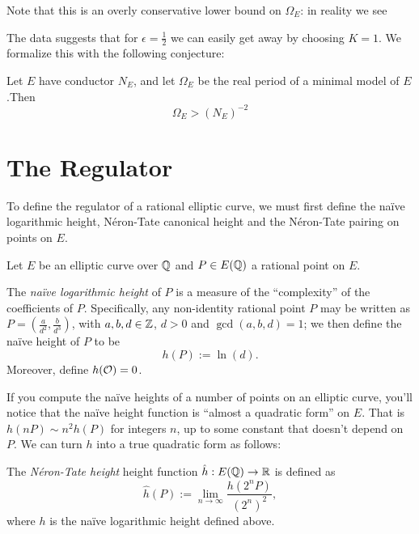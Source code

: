 \documentclass[10pt]{article}
\begin{document}
Note that this is an overly conservative lower bound on $\Omega_E$: in reality we see

The data suggests that for $\epsilon=\frac{1}{2}$ we can easily get away by choosing $K = 1$. We formalize this with the following conjecture:
\begin{conjecture}
Let $E$ have conductor $N_E$, and let $\Omega_E$ be the real period of a minimal model of $E$.Then 
\begin{equation}
\Omega_E > (N_E)^{-2}
\end{equation}
\end{conjecture}

\newpage
\section{The Regulator}

To define the regulator of a rational elliptic curve, we must first define the na\"ive logarithmic height, N\'eron-Tate canonical height and the N\'eron-Tate pairing on points on $E$.

Let $E$ be an elliptic curve over $\mathbb{Q}$ and $P \in E(\mathbb{Q})$ a rational point on $E$. 

\begin{definition}
The {\it na\"ive logarithmic height} of $P$ is a measure of the ``complexity'' of the coefficients of $P$. Specifically, any non-identity rational point $P$ may be written as $P = (\frac{a}{d^2},\frac{b}{d^3})$, with $a,b,d \in \mathbb{Z}$, $d>0$ and $\gcd(a,b,d) = 1$; we then define the na\"ive height of $P$ to be
\begin{equation}
	h(P) := \ln(d).
\end{equation}
Moreover, define $h(\mathcal{O}) = 0$.
\end{definition}
If you compute the na\"ive heights of a number of points on an elliptic curve, you'll notice that the na\"ive height function is ``almost a quadratic form'' on $E$. That is $h(nP) \sim n^2 h(P)$ for integers $n$, up to some constant that doesn't depend on $P$. We can turn $h$ into a true quadratic form as follows:

\begin{definition}
The {\it N\'eron-Tate height} height function $\hat{h}: E(\mathbb{Q}) \to \mathbb{R}$ is defined as
\begin{equation}
	\hat{h}(P) := \lim_{n \to \infty} \frac{h(2^n P)}{(2^n)^2},
\end{equation}
where $h$ is the na\"ive logarithmic height defined above.
\end{definition}
\end{document}
